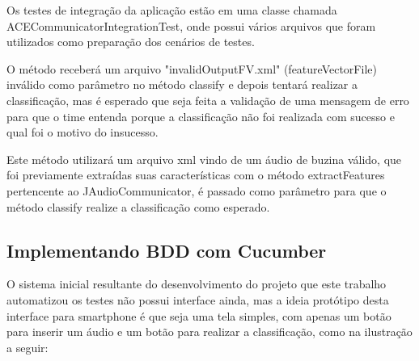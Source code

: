 \begin{itemize}
Os testes de integração da aplicação estão em uma classe chamada ACECommunicatorIntegrationTest, onde possui vários arquivos que foram utilizados como preparação dos cenários de testes.

O método receberá um arquivo "invalidOutputFV.xml" (featureVectorFile) inválido como parâmetro no método classify e depois tentará realizar a classificação, mas é esperado que seja feita a validação de uma mensagem de erro para que o time entenda porque a classificação não foi realizada com sucesso e qual foi o motivo do insucesso. 

Este método utilizará um arquivo xml vindo de um áudio de buzina válido, que foi previamente extraídas suas características com o método extractFeatures pertencente ao JAudioCommunicator, é passado como parâmetro para que o método classify realize a classificação como esperado.

\end{itemize}

\subsection{Implementando BDD com Cucumber}

O sistema inicial resultante do desenvolvimento do projeto que este trabalho automatizou os testes não possui interface ainda, mas a ideia protótipo desta interface para smartphone é que seja uma tela simples, com apenas um botão para inserir um áudio e um botão para realizar a classificação, como na ilustração a seguir:


